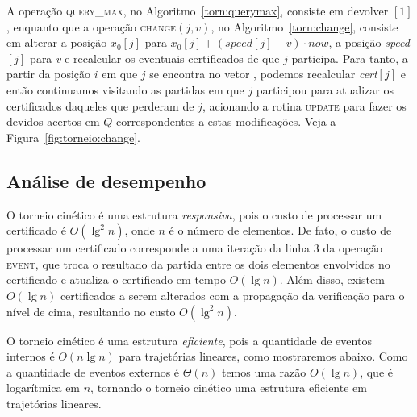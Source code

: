 



A operação \textsc{query\_max}, no Algoritmo~\ref{torn:querymax},
consiste em devolver \torneio$[1]$, enquanto que a operação \textsc{change}$(j, v)$, no
Algoritmo~\ref{torn:change}, consiste em alterar a posição $x_0[j]$ para ${x_0[j] +
(\mathit{speed}[j] - v)\cdot now}$, a posição \textit{speed}$[j]$ para \textit{v} e recalcular os
eventuais certificados de que $j$ participa.
Para tanto, a partir da posição $i$ em que $j$ se encontra no vetor \torneio, podemos recalcular
\textit{cert}$[j]$ e então continuamos visitando as partidas em que $j$ participou para atualizar
os certificados daqueles que perderam de $j$, acionando a rotina \textsc{update} para fazer os
devidos acertos em $Q$ correspondentes a estas modificações.
Veja a Figura~\ref{fig:torneio:change}.









\FloatBarrier

\subsection{Análise de desempenho}\label{subsec:torneio:analise-de-desempenho}

O torneio cinético é uma estrutura \textit{responsiva}, pois o custo de
processar um certificado é $O(\lg^2{n})$, onde $n$ é o número de elementos.
De fato, o custo de processar um certificado corresponde a uma iteração da linha $3$ da operação
\textsc{event}, que troca o resultado da partida entre os dois elementos envolvidos no certificado
e atualiza o certificado em tempo $O(\lg{n})$.
Além disso, existem $O(\lg{n})$ certificados a serem alterados com a propagação da verificação
para o nível de cima, resultando no custo $O(\lg^2{n})$.

O torneio cinético é uma estrutura \textit{eficiente}, pois a quantidade de eventos internos é
$O(n\lg{n})$ para trajetórias lineares, como mostraremos abaixo.
Como a quantidade de eventos externos é $\Theta(n)$ temos uma razão $O(\lg{n})$, que é logarítmica
em $n$, tornando o torneio cinético uma estrutura eficiente em trajetórias lineares.

